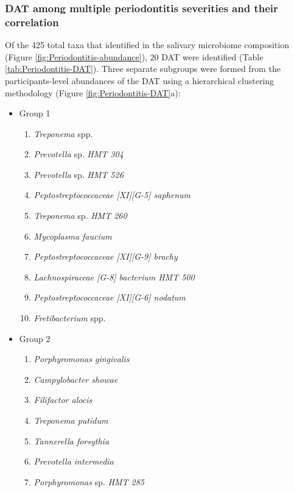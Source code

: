 \documentclass[11pt, a4paper, onecolumn, oneside]{report}
\begin{document}
            \subsubsection{DAT among multiple periodontitis severities and their correlation}
                Of the 425 total taxa that identified in the salivary microbiome composition (Figure \ref{fig:Periodontitis-abundance}), 20 DAT were identified (Table \ref{tab:Periodontitis-DAT}). Three separate subgroups were formed from the participants-level abundances of the DAT using a hierarchical clustering methodology (Figure \ref{fig:Periodontitis-DAT}a):
                \begin{itemize}
                    \item Group 1
                    \begin{enumerate}
                        \item \textit{Treponema} spp.
                        \item \textit{Prevotella} sp. \textit{HMT 304}
                        \item \textit{Prevotella} sp. \textit{HMT 526}
                        \item \textit{Peptostreptococcaceae [XI][G-5] saphenum}
                        \item \textit{Treponema} sp. \textit{HMT 260}
                        \item \textit{Mycoplasma faucium}
                        \item \textit{Peptostreptococcaceae [XI][G-9] brachy}
                        \item \textit{Lachnospiraceae [G-8] bacterium HMT 500}
                        \item \textit{Peptostreptococcaceae [XI][G-6] nodatum}
                        \item \textit{Fretibacterium} spp.
                    \end{enumerate}

                    \item Group 2
                    \begin{enumerate}
                        \item \textit{Porphyromonas gingivalis}
                        \item \textit{Campylobacter showae}
                        \item \textit{Filifactor alocis}
                        \item \textit{Treponema putidum}
                        \item \textit{Tannerella forsythia}
                        \item \textit{Prevotella intermedia}
                        \item \textit{Porphyromonas} sp. \textit{HMT 285}
                    \end{enumerate}


\end{itemize}
\end{document}
